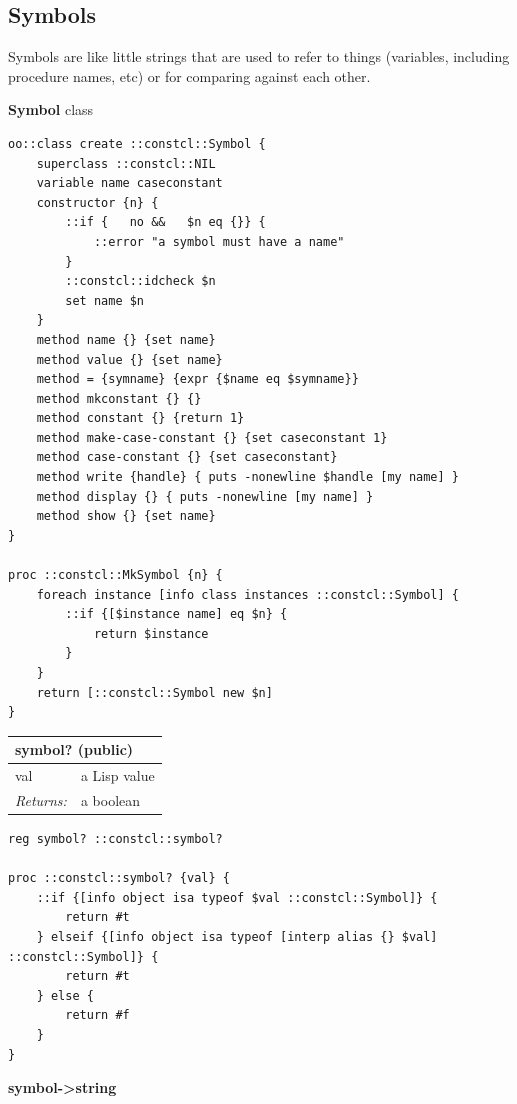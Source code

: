 \documentclass[twoside,9pt]{report}
\begin{document}
\subsection{Symbols}
\label{symbols}

Symbols are like little strings that are used to refer to things (variables, including procedure names, etc) or for comparing against each other.


\textbf{Symbol} class

\noindent\makebox[\linewidth]{\rule{\linewidth}{0.4pt}}
\begin{lstlisting}
oo::class create ::constcl::Symbol {
    superclass ::constcl::NIL
    variable name caseconstant
    constructor {n} {
        ::if {   no &&   $n eq {}} {
            ::error "a symbol must have a name"
        }
        ::constcl::idcheck $n
        set name $n
    }
    method name {} {set name}
    method value {} {set name}
    method = {symname} {expr {$name eq $symname}}
    method mkconstant {} {}
    method constant {} {return 1}
    method make-case-constant {} {set caseconstant 1}
    method case-constant {} {set caseconstant}
    method write {handle} { puts -nonewline $handle [my name] }
    method display {} { puts -nonewline [my name] }
    method show {} {set name}
}
 
proc ::constcl::MkSymbol {n} {
    foreach instance [info class instances ::constcl::Symbol] {
        ::if {[$instance name] eq $n} {
            return $instance
        }
    }
    return [::constcl::Symbol new $n]
}
\end{lstlisting}
\noindent\makebox[\linewidth]{\rule{\linewidth}{0.4pt}}
\begin{tabular}{ |l l| }
\hline
\multicolumn{2}{|l|}{symbol? (public)} \\
\hline
val & a Lisp value \\
\textit{Returns:} & a boolean \\
\hline
\end{tabular}

\noindent\makebox[\linewidth]{\rule{\linewidth}{0.4pt}}
\begin{lstlisting}
reg symbol? ::constcl::symbol?
 
proc ::constcl::symbol? {val} {
    ::if {[info object isa typeof $val ::constcl::Symbol]} {
        return #t
    } elseif {[info object isa typeof [interp alias {} $val] ::constcl::Symbol]} {
        return #t
    } else {
        return #f
    }
}
\end{lstlisting}
\noindent\makebox[\linewidth]{\rule{\linewidth}{0.4pt}}

\textbf{symbol->string}
\end{document}

